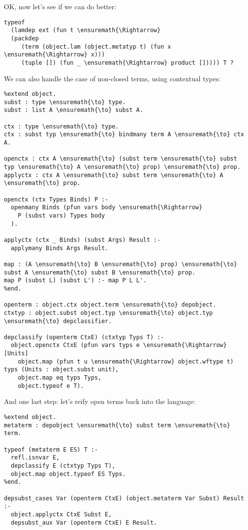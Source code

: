 OK, now let's see if we can do better:

\begin{verbatim}
typeof
  (lamdep ext (fun t \ensuremath{\Rightarrow}
  (packdep
     (term (object.lam (object.metatyp t) (fun x \ensuremath{\Rightarrow} x)))
     (tuple []) (fun _ \ensuremath{\Rightarrow} product [])))) T ?
\end{verbatim}

We can also handle the case of non-closed terms, using contextual types:

\begin{verbatim}
%extend object.
subst : type \ensuremath{\to} type.
subst : list A \ensuremath{\to} subst A.

ctx : type \ensuremath{\to} type.
ctx : subst typ \ensuremath{\to} bindmany term A \ensuremath{\to} ctx A.

openctx : ctx A \ensuremath{\to} (subst term \ensuremath{\to} subst typ \ensuremath{\to} A \ensuremath{\to} prop) \ensuremath{\to} prop.
applyctx : ctx A \ensuremath{\to} subst term \ensuremath{\to} A \ensuremath{\to} prop.

openctx (ctx Types Binds) P :-
  openmany Binds (pfun vars body \ensuremath{\Rightarrow}
    P (subst vars) Types body
  ).

applyctx (ctx _ Binds) (subst Args) Result :-
  applymany Binds Args Result.

map : (A \ensuremath{\to} B \ensuremath{\to} prop) \ensuremath{\to} subst A \ensuremath{\to} subst B \ensuremath{\to} prop.
map P (subst L) (subst L') :- map P L L'.
%end.

openterm : object.ctx object.term \ensuremath{\to} depobject.
ctxtyp : object.subst object.typ \ensuremath{\to} object.typ \ensuremath{\to} depclassifier.

depclassify (openterm CtxE) (ctxtyp Typs T) :-
  object.openctx CtxE (pfun vars typs e \ensuremath{\Rightarrow} [Units]
    object.map (pfun t u \ensuremath{\Rightarrow} object.wftype t) typs (Units : object.subst unit),
    object.map eq typs Typs,
    object.typeof e T).
\end{verbatim}

And one last step: let's reify open terms back into the language:

\begin{verbatim}
%extend object.
metaterm : depobject \ensuremath{\to} subst term \ensuremath{\to} term.

typeof (metaterm E ES) T :-
  refl.isnvar E,
  depclassify E (ctxtyp Typs T),
  object.map object.typeof ES Typs.
%end.

depsubst_cases Var (openterm CtxE) (object.metaterm Var Subst) Result :-
  object.applyctx CtxE Subst E,
  depsubst_aux Var (openterm CtxE) E Result.
\end{verbatim}

